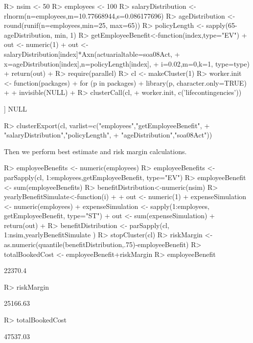\documentclass[nojss]{jss}
\begin{document}
\begin{Schunk}
\begin{Sinput}
R> nsim <- 50
R> employees <- 100
R> salaryDistribution <- rlnorm(n=employees,m=10.77668944,s=0.086177696)
R> ageDistribution <- round(runif(n=employees,min=25, max=65))
R> policyLength <- sapply(65-ageDistribution, min, 1)
R> getEmployeeBenefit<-function(index,type="EV") {
+  	out <- numeric(1)
+  	out <- salaryDistribution[index]*Axn(actuarialtable=soa08Act, 
+  			x=ageDistribution[index],n=policyLength[index], 
+  			i=0.02,m=0,k=1, type=type)
+  	return(out)
+  }
R> require(parallel)
R> cl <- makeCluster(1) 
R> worker.init <- function(packages) {
+  	for (p in packages) {
+  		library(p, character.only=TRUE)
+  	}
+  	invisible(NULL)
+  }
R> clusterCall(cl, 
+  		worker.init, c('lifecontingencies'))
\end{Sinput}
\begin{Soutput}
[[1]]
NULL
\end{Soutput}
\begin{Sinput}
R> clusterExport(cl, varlist=c("employees","getEmployeeBenefit",
+  				"salaryDistribution","policyLength",
+  				"ageDistribution","soa08Act"))
\end{Sinput}
\end{Schunk}
Then we perform best estimate and risk margin calculations.

\begin{Schunk}
\begin{Sinput}
R> employeeBenefits <- numeric(employees)
R> employeeBenefits <- parSapply(cl, 1:employees,getEmployeeBenefit, type="EV")
R> employeeBenefit <- sum(employeeBenefits)
R> benefitDistribution<-numeric(nsim)
R> yearlyBenefitSimulate<-function(i)
+  {
+  	out <- numeric(1)
+  	expenseSimulation <- numeric(employees)
+  	expenseSimulation <- sapply(1:employees, getEmployeeBenefit, type="ST")
+  	out <- sum(expenseSimulation)
+  	return(out)
+  }
R> benefitDistribution <- parSapply(cl, 1:nsim,yearlyBenefitSimulate )
R> stopCluster(cl)
R> riskMargin <- as.numeric(quantile(benefitDistribution,.75)-employeeBenefit)
R> totalBookedCost <- employeeBenefit+riskMargin
R> employeeBenefit
\end{Sinput}
\begin{Soutput}
[1] 22370.4
\end{Soutput}
\begin{Sinput}
R> riskMargin
\end{Sinput}
\begin{Soutput}
[1] 25166.63
\end{Soutput}
\begin{Sinput}
R> totalBookedCost
\end{Sinput}
\begin{Soutput}
[1] 47537.03
\end{Soutput}
\end{Schunk}
\end{document}
